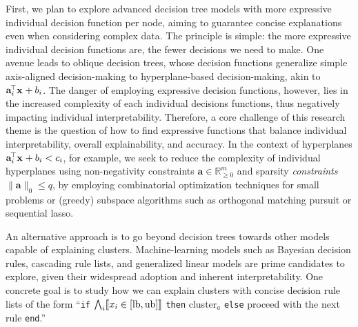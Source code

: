 \documentclass[a4paper,11pt]{article}
\begin{document}
First, we plan to explore advanced decision tree models with more expressive individual decision function per node, aiming to guarantee concise explanations even when considering complex data.
The principle is simple: the more expressive individual decision functions are, the fewer decisions we need to make. 
One avenue leads to oblique decision trees, whose decision functions generalize simple axis-aligned decision-making to hyperplane-based decision-making, akin to $\mathbf{a}_i^{\!\top} \mathbf{x}^{\vphantom{\top}}_{\vphantom{i}} + b_i$. %
The danger of employing expressive decision functions, however, lies in the increased complexity of each individual decisions functions, thus negatively impacting individual interpretability.
Therefore, a core challenge of this research theme is the question of how to find expressive functions that balance individual interpretability, overall explainability, and accuracy.
In the context of hyperplanes $\mathbf{a}_i^{\!\top} \mathbf{x}^{\vphantom{\top}}_{\vphantom{i}} + b_i < c_i$, for example, we seek to reduce the complexity of individual hyperplanes using non-negativity constraints $\mathbf{a} \in \mathbb{R}^m_{\geq 0}$ and sparsity \emph{constraints} $\|\mathbf{a}\|_0 \leq q$, by employing combinatorial optimization techniques for small problems or (greedy) subspace algorithms such as orthogonal matching pursuit or sequential lasso.

An alternative approach is to go beyond decision trees towards other models capable of explaining clusters. 
Machine-learning models such as Bayesian decision rules, cascading rule lists, and generalized linear models 
are prime candidates to explore, given their widespread adoption and inherent interpretability. 
One concrete goal is to study how we can explain clusters with concise decision rule lists 
of the form ``\texttt{if} $\bigwedge_i \llbracket x_i \in [\textnormal{lb}, \textnormal{ub}] \rrbracket$ 
\texttt{then} cluster$_a$ \texttt{else} proceed with the next rule \texttt{end}.'' 
\end{document}
